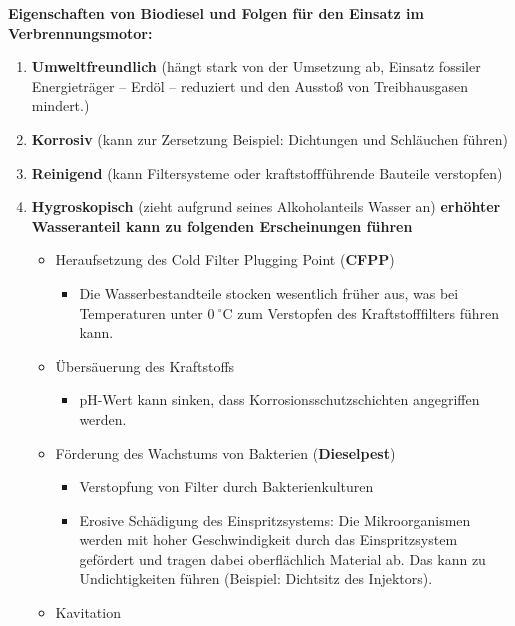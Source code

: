 \textbf{Eigenschaften von Biodiesel und Folgen für den Einsatz im
Verbrennungsmotor:}

\begin{enumerate}
\item
  \textbf{Umweltfreundlich} (hängt stark von der Umsetzung ab, Einsatz
  fossiler Energieträger -- Erdöl -- reduziert und den Ausstoß von
  Treibhausgasen mindert.)
\item
  \textbf{Korrosiv} (kann zur Zersetzung Beispiel: Dichtungen und
  Schläuchen führen)
\item
  \textbf{Reinigend} (kann Filtersysteme oder kraftstoffführende
  Bauteile verstopfen)
\item
  \textbf{Hygroskopisch} (zieht aufgrund seines Alkoholanteils Wasser
  an) \textbf{erhöhter Wasseranteil kann zu folgenden Erscheinungen
  führen}

  \begin{itemize}
  \item
    Heraufsetzung des Cold Filter Plugging Point (\textbf{CFPP})

    \begin{itemize}
    \item
      Die Wasserbestandteile stocken wesentlich früher aus, was bei
      Temperaturen unter $0~^\circ\text{C}$ zum Verstopfen des
      Kraftstofffilters führen kann.
    \end{itemize}
  \item
    Übersäuerung des Kraftstoffs

    \begin{itemize}
    \item
      pH-Wert kann sinken, dass Korrosionsschutzschichten angegriffen
      werden.
    \end{itemize}
  \item
    Förderung des Wachstums von Bakterien (\textbf{Dieselpest})

    \begin{itemize}
    \item
      Verstopfung von Filter durch Bakterienkulturen
    \item
      Erosive Schädigung des Einspritzsystems: Die Mikroorganismen
      werden mit hoher Geschwindigkeit durch das Einspritzsystem
      gefördert und tragen dabei oberflächlich Material ab. Das kann zu
      Undichtigkeiten führen (Beispiel: Dichtsitz des Injektors).
    \end{itemize}
  \item
    Kavitation


\end{itemize}
\end{enumerate}
